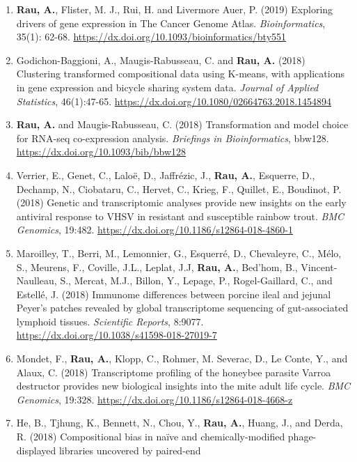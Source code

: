 \documentclass[11pt, a4paper]{awesome-cv}
\begin{document}
\begin{enumerate}
{  Animal Breeding and Genetics}, 137:49-59.
  \url{https://dx.doi.org/10.1111/jbg.12427}
\item
  \textbf{Rau, A.}, Flister, M. J., Rui, H. and Livermore Auer, P.
  (2019) Exploring drivers of gene expression in The Cancer Genome
  Atlas. \emph{Bioinformatics}, 35(1): 62-68.
  \url{https://dx.doi.org/10.1093/bioinformatics/bty551}
\item
  Godichon-Baggioni, A., Maugis-Rabusseau, C. and \textbf{Rau, A.}
  (2018) Clustering transformed compositional data using K-means, with
  applications in gene expression and bicycle sharing system data.
  \emph{Journal of Applied Statistics}, 46(1):47-65.
  \url{https://dx.doi.org/10.1080/02664763.2018.1454894}
\item
  \textbf{Rau, A.} and Maugis-Rabusseau, C. (2018) Transformation and
  model choice for RNA-seq co-expression analysis. \emph{Briefings in
  Bioinformatics}, bbw128. \url{https://dx.doi.org/10.1093/bib/bbw128}
\item
  Verrier, E., Genet, C., Laloë, D., Jaffrézic, J., \textbf{Rau, A.},
  Esquerre, D., Dechamp, N., Ciobataru, C., Hervet, C., Krieg, F.,
  Quillet, E., Boudinot, P. (2018) Genetic and transcriptomic analyses
  provide new insights on the early antiviral response to VHSV in
  resistant and susceptible rainbow trout. \emph{BMC Genomics}, 19:482.
  \url{https://dx.doi.org/10.1186/s12864-018-4860-1}
\item
  Maroilley, T., Berri, M., Lemonnier, G., Esquerré, D., Chevaleyre, C.,
  Mélo, S., Meurens, F., Coville, J.L., Leplat, J.J, \textbf{Rau, A.},
  Bed'hom, B., Vincent-Naulleau, S., Mercat, M.J., Billon, Y., Lepage,
  P., Rogel-Gaillard, C., and Estellé, J. (2018) Immunome differences
  between porcine ileal and jejunal Peyer's patches revealed by global
  transcriptome sequencing of gut-associated lymphoid tissues.
  \emph{Scientific Reports}, 8:9077.
  \url{https://dx.doi.org/10.1038/s41598-018-27019-7}
\item
  Mondet, F., \textbf{Rau, A.}, Klopp, C., Rohmer, M. Severac, D., Le
  Conte, Y., and Alaux, C. (2018) Transcriptome profiling of the
  honeybee parasite Varroa destructor provides new biological insights
  into the mite adult life cycle. \emph{BMC Genomics}, 19:328.
  \url{https://dx.doi.org/10.1186/s12864-018-4668-z}
\item
  He, B., Tjhung, K., Bennett, N., Chou, Y., \textbf{Rau, A.}, Huang,
  J., and Derda, R. (2018) Compositional bias in naïve and
  chemically-modified phage-displayed libraries uncovered by paired-end

\end{enumerate}
\end{document}
